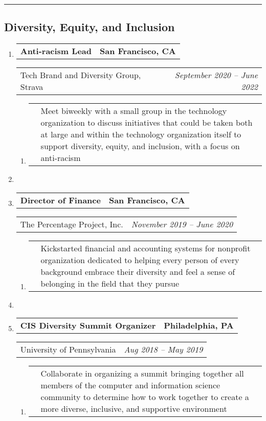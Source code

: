 \documentclass[letterpaper]{article}
\makeatletter
\newcommand*{\tabulardef}[3]{\begin{tabular}[t]{@{}lp{\dimexpr\linewidth-#1}@{}}
    #2&#3
\end{tabular}}
\newcommand{\headerrow}[2]
{\begin{tabular*}{\linewidth}{l@{\extracolsep{\fill}}r}
	#1 &
	#2 \\
\end{tabular*}}
\makeatother
\begin{document}
\hrule

\newpage

\subsection*{Diversity, Equity, and Inclusion}
\begin{enumerate}[label=]
	\parskip=-0.25em
	\item
		\headerrow
			{\textbf{Anti-racism Lead}}
			{\textbf{San Francisco, CA}}
	\headerrow
		{Tech Brand and Diversity Group, Strava}
		{\emph{September 2020 -- June 2022}}
	\begin{enumerate}[label= *]
	\parskip=-0.1em
		\item\tabulardef{5cm}{}{Meet biweekly with a small group in the technology organization to discuss initiatives that could be taken both at large and within the technology organization itself to support diversity, equity, and inclusion, with a focus on anti-racism}
	\end{enumerate}

    \item
 
	\item
		\headerrow
			{\textbf{Director of Finance}}
			{\textbf{San Francisco, CA}}
	\headerrow
		{The Percentage Project, Inc.}
		{\emph{November 2019 -- June 2020}}
	\begin{enumerate}[label= *]
	\parskip=-0.1em
		\item\tabulardef{5cm}{}{Kickstarted financial and accounting systems for nonprofit organization dedicated to helping every person of every background embrace their diversity and feel a sense of belonging in the field that they pursue}
	\end{enumerate}

    \item

	\item
		\headerrow
			{\textbf{CIS Diversity Summit Organizer}}
			{\textbf{Philadelphia, PA}}
	\headerrow
		{University of Pennsylvania}
		{\emph{Aug 2018 -- May 2019}}
	\begin{enumerate}[label= *]
	\parskip=-0.1em
		\item\tabulardef{5cm}{}{Collaborate in organizing a summit bringing together all members of the computer and information science community to determine how to work together to create a more diverse, inclusive, and supportive environment}
	\end{enumerate}


\end{enumerate}
\end{document}
